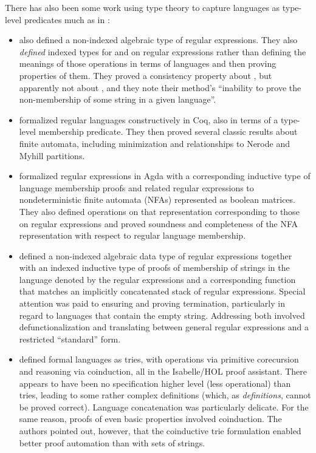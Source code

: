 \documentclass[acmsmall,screen,timestamp,anonymous,review]{acmart}
\begin{document}
There has also been some work using type theory to capture languages as type-level predicates much as in :
\begin{itemize}

\item \citet{AgularMannaa2009} also defined a non-indexed algebraic type of regular expressions.
They also \emph{defined} indexed types for  and  on regular expressions rather than defining the meanings of those operations in terms of languages and then proving properties of them.
They proved a consistency property about , but apparently not about , and they note their method's ``inability to prove the non-membership of some string in a given language''.

\item \citet{DoczkalEtAl2013} formalized regular languages constructively in Coq, also in terms of a type-level membership predicate.
They then proved several classic results about finite automata, including minimization and relationships to Nerode and Myhill partitions.

\item \citet{FirsovUustalu2013} formalized regular expressions in Agda with a corresponding inductive type of language membership proofs and related regular expressions to nondeterministic finite automata (NFAs) represented as boolean matrices.
They also defined operations on that representation corresponding to those on regular expressions and proved soundness and completeness of the NFA representation with respect to regular language membership.

\item \citet{KorkutEtAl2016} defined a non-indexed algebraic data type of regular expressions together with an indexed inductive type of proofs of membership of strings in the language denoted by the regular expressions and a corresponding function that matches an implicitly concatenated stack of regular expressions.
Special attention was paid to ensuring and proving termination, particularly in regard to languages that contain the empty string.
Addressing both involved defunctionalization and translating between general regular expressions and a restricted ``standard'' form.

\item \citet{Traytel2017} defined formal languages as tries, with operations via primitive corecursion and reasoning via coinduction, all in the Isabelle/HOL proof assistant.
There appears to have been no specification higher level (less operational) than tries, leading to some rather complex definitions (which, as \emph{definitions}, cannot be proved correct).
Language concatenation was particularly delicate.
For the same reason, proofs of even basic properties involved coinduction.
The authors pointed out, however, that the coinductive trie formulation enabled better proof automation than with sets of strings.


\end{itemize}
\end{document}
